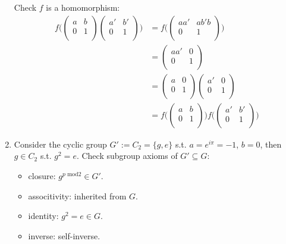 \documentclass[a4paper]{article}
\begin{document}
\begin{ans}
\begin{enumerate}[label=(\alph*)]
\begin{itemize}
\end{itemize}
Check $f$ is a homomorphism:
\begin{align}
    f\bigg(\begin{pmatrix}a&b\\0&1\\\end{pmatrix}\begin{pmatrix}a'&b'\\0&1\\\end{pmatrix}\bigg)&=f\bigg(\begin{pmatrix}aa'&ab'b\\0&1\\\end{pmatrix}\bigg)\nonumber\\&=\begin{pmatrix}aa'&0\\0&1\\\end{pmatrix}\nonumber\\&=\begin{pmatrix}a&0\\0&1\\\end{pmatrix}\begin{pmatrix}a'&0\\0&1\\\end{pmatrix}\nonumber\\&=f\bigg(\begin{pmatrix}a&b\\0&1\\\end{pmatrix}\bigg)f\bigg(\begin{pmatrix}a'&b'\\0&1\\\end{pmatrix}\bigg)\nonumber
\end{align}
\item Consider the cyclic group $G':=C_2=\{g,e\}$ s.t. $a=e^{i\pi}=-1$, $b=0$, then $g\in C_2$ s.t. $g^2=e$. Check subgroup axioms of $G'\subseteq G$:
\begin{itemize}
    \item closure: $g^{p\text{ mod}2}\in G'$.
    \item associtivity: inherited from $G$.
    \item identity: $g^2=e\in G$.
    \item inverse: self-inverse.
\end{itemize}

\end{enumerate}
\end{ans}
\end{document}

